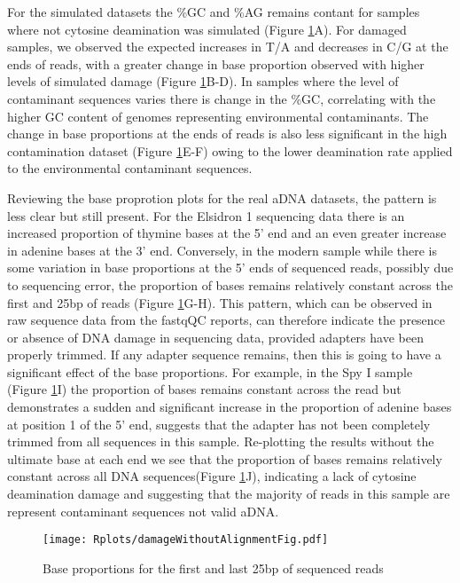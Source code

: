 \documentclass[12pt, a4paper]{article}
\begin{document}
For the simulated datasets the \%GC and \%AG remains contant for samples where not cytosine deamination was simulated (Figure \ref{fig:damageWithoutAlignment}A). 
For damaged samples, we observed the expected increases in T/A and decreases in C/G at the ends of reads, with a greater change in base proportion observed with higher levels of simulated damage (Figure \ref{fig:damageWithoutAlignment}B-D).
In samples where the level of contaminant sequences varies there is change in the \%GC, correlating with the higher GC content of genomes representing environmental contaminants. 
The change in base proportions at the ends of reads is also less significant in the high contamination dataset (Figure \ref{fig:damageWithoutAlignment}E-F) owing to the lower deamination rate applied to the environmental contaminant sequences.

Reviewing the base proprotion plots for the real aDNA datasets, the pattern is less clear but still present. 
For the Elsidron 1 sequencing data there is an increased proportion of thymine bases at the 5' end and an even greater increase in adenine bases at the 3' end.
Conversely, in the modern sample while there is some variation in base proportions at the 5' ends of sequenced reads, possibly due to sequencing error, the proportion of bases remains relatively constant across the first and 25bp of reads (Figure \ref{fig:damageWithoutAlignment}G-H).
This pattern, which can be observed in raw sequence data from the fastqQC reports, can therefore indicate the presence or absence of DNA damage in sequencing data, provided adapters have been properly trimmed.
If any adapter sequence remains, then this is going to have a significant effect of the base proportions.
For example, in the Spy I sample (Figure \ref{fig:damageWithoutAlignment}I) the proportion of bases remains constant across the read but demonstrates a sudden and significant increase in the proportion of adenine bases at position 1 of the 5' end, suggests that the adapter has not been completely trimmed from all sequences in this sample.
Re-plotting the results without the ultimate base at each end we see that the proportion of bases remains relatively constant across all DNA sequences(Figure \ref{fig:damageWithoutAlignment}J), indicating a lack of cytosine deamination damage and suggesting that the majority of reads in this sample are represent contaminant sequences not valid aDNA.

\begin{figure}[ht!]
	\centering
	\texttt{[image: Rplots/damageWithoutAlignmentFig.pdf]}
	\small\caption{Base proportions for the first and last 25bp of sequenced reads}\label{fig:damageWithoutAlignment}
\end{figure}
\clearpage
\end{document}
